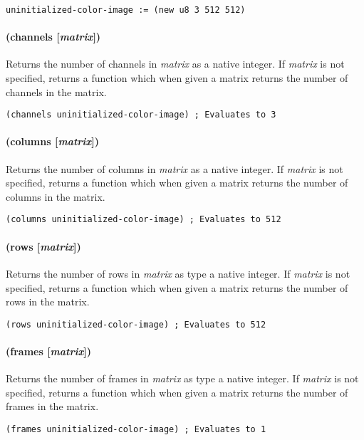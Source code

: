 \documentclass[numbers=noenddot]{scrbook}
\begin{document}
\begin{verbatim}
uninitialized-color-image := (new u8 3 512 512)
\end{verbatim}

\paragraph{(channels [\emph{matrix}])}
Returns the number of channels in \emph{matrix} as a native integer.
If \emph{matrix} is not specified, returns a function which when given a matrix returns the number of channels in the matrix.

\begin{verbatim}
(channels uninitialized-color-image) ; Evaluates to 3
\end{verbatim}

\paragraph{(columns [\emph{matrix}])}
Returns the number of columns in \emph{matrix} as a native integer.
If \emph{matrix} is not specified, returns a function which when given a matrix returns the number of columns in the matrix.

\begin{verbatim}
(columns uninitialized-color-image) ; Evaluates to 512
\end{verbatim}

\paragraph{(rows [\emph{matrix}])}
Returns the number of rows in \emph{matrix} as type a native integer.
If \emph{matrix} is not specified, returns a function which when given a matrix returns the number of rows in the matrix.

\begin{verbatim}
(rows uninitialized-color-image) ; Evaluates to 512
\end{verbatim}

\paragraph{(frames [\emph{matrix}])}
Returns the number of frames in \emph{matrix} as type a native integer.
If \emph{matrix} is not specified, returns a function which when given a matrix returns the number of frames in the matrix.

\begin{verbatim}
(frames uninitialized-color-image) ; Evaluates to 1
\end{verbatim}
\end{document}
